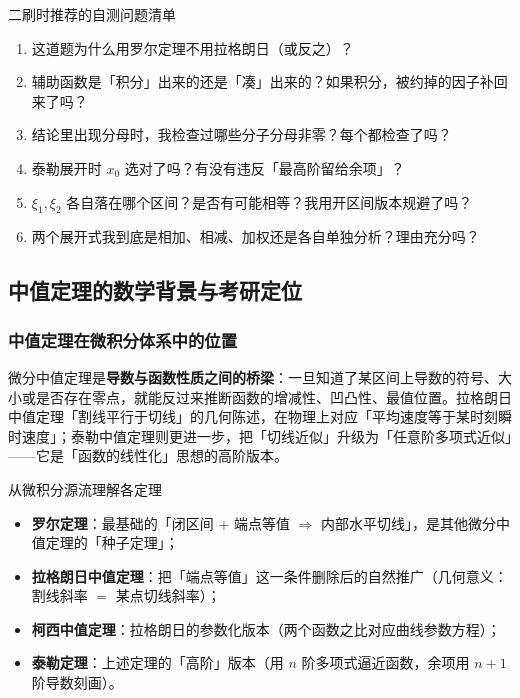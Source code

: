 \documentclass[a4paper]{article}
\begin{document}
\begin{knowledgebox}{二刷时推荐的自测问题清单}
\begin{enumerate}
\item 这道题为什么用罗尔定理不用拉格朗日（或反之）？
\item 辅助函数是「积分」出来的还是「凑」出来的？如果积分，被约掉的因子补回来了吗？
\item 结论里出现分母时，我检查过哪些分子分母非零？每个都检查了吗？
\item 泰勒展开时 $x_0$ 选对了吗？有没有违反「最高阶留给余项」？
\item $\xi_1,\xi_2$ 各自落在哪个区间？是否有可能相等？我用开区间版本规避了吗？
\item 两个展开式我到底是相加、相减、加权还是各自单独分析？理由充分吗？
\end{enumerate}
\end{knowledgebox}


\subsection{中值定理的数学背景与考研定位}

\subsubsection{中值定理在微积分体系中的位置}

微分中值定理是\textbf{导数与函数性质之间的桥梁}：一旦知道了某区间上导数的符号、大小或是否存在零点，就能反过来推断函数的增减性、凹凸性、最值位置。拉格朗日中值定理「割线平行于切线」的几何陈述，在物理上对应「平均速度等于某时刻瞬时速度」；泰勒中值定理则更进一步，把「切线近似」升级为「任意阶多项式近似」——它是「函数的线性化」思想的高阶版本。

\begin{knowledgebox}{从微积分源流理解各定理}
\begin{itemize}
\item \textbf{罗尔定理}：最基础的「闭区间 + 端点等值 $\Rightarrow$ 内部水平切线」，是其他微分中值定理的「种子定理」；
\item \textbf{拉格朗日中值定理}：把「端点等值」这一条件删除后的自然推广（几何意义：割线斜率 $=$ 某点切线斜率）；
\item \textbf{柯西中值定理}：拉格朗日的参数化版本（两个函数之比对应曲线参数方程）；
\item \textbf{泰勒定理}：上述定理的「高阶」版本（用 $n$ 阶多项式逼近函数，余项用 $n+1$ 阶导数刻画）。
\end{itemize}
\end{knowledgebox}
\end{document}
